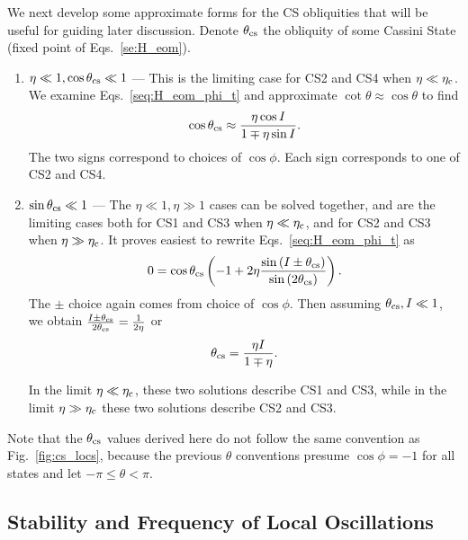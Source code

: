 \documentclass[
        fleqn,
        usenatbib,
    ]{mnras}
\newcommand*{\p}[1]{\left(#1\right)}
\begin{document}
We next develop some approximate forms for the CS obliquities that will be
useful for guiding later discussion. Denote $\theta_{\rm cs}$ the obliquity of
some Cassini State (fixed point of Eqs.~\eqref{se:H_eom}).
\begin{enumerate}
    \item $\eta \ll 1, \cos \theta_{\rm cs} \ll 1$ --- This is the limiting case
        for CS2 and CS4 when $\eta \ll \eta_{\rm c}$. We examine
        Eqs.~\eqref{seq:H_eom_phi_t} and approximate $\cot \theta \approx \cos
        \theta$ to find
        \begin{equation}
            \cos \theta_{\rm cs} \approx \frac{\eta \cos I}
                {1 \mp \eta \sin I}.
        \end{equation}
        The two signs correspond to choices of $\cos \phi$. Each sign
        corresponds to one of CS2 and CS4.

    \item $\sin \theta_{\rm cs} \ll 1$ --- The $\eta \ll 1, \eta \gg 1$ cases
        can be solved together, and are the limiting cases both for CS1 and CS3
        when $\eta \ll \eta_{\rm c}$, and for CS2 and CS3 when $\eta \gg
        \eta_{\rm c}$. It proves easiest to rewrite Eqs.~\eqref{seq:H_eom_phi_t}
        as
        \begin{equation}
            0 = \cos \theta_{\rm cs}\p{-1 + 2\eta
                \frac{\sin \p{I \pm \theta_{\rm cs}}}{\sin \p{2\theta_{\rm
                    cs}}}}.\label{eq:rewritten_dphi}
        \end{equation}
        The $\pm$ choice again comes from choice of $\cos \phi$. Then assuming
        $\theta_{\rm cs}, I \ll 1$, we obtain $\frac{I \pm
        \theta_{\rm cs}}{2\theta_{\rm cs}} = \frac{1}{2\eta}$ or
        \begin{equation}
            \theta_{\rm cs} = \frac{\eta I}{1 \mp \eta}.
        \end{equation}

        In the limit $\eta \ll \eta_{\rm c}$, these two solutions describe CS1
        and CS3, while in the limit $\eta \gg \eta_{\rm c}$ these two solutions
        describe CS2 and CS3.
\end{enumerate}
Note that the $\theta_{\rm cs}$ values derived here do not follow the same
convention as Fig.~\ref{fig:cs_locs}, because the previous $\theta$ conventions
presume $\cos \phi = -1$ for all states and let $-\pi \leq \theta < \pi$.

\subsection{Stability and Frequency of Local Oscillations}\label{ss:eigens}
\end{document}
